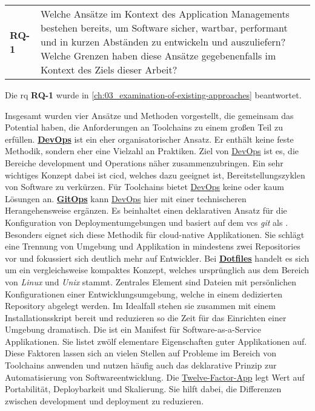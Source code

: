 \vspace{1em}
\begin{table}[H]
    \centering
    \begin{tabular}{p{} p{}}
        \textbf{RQ-1} & Welche Ansätze im Kontext des Application Managements bestehen bereits, um Software sicher, wartbar, performant und in kurzen Abständen zu entwickeln und auszuliefern? Welche Grenzen haben diese Ansätze gegebenenfalls im Kontext des Ziels dieser Arbeit? \\
    \end{tabular}
\end{table}

Die \acrlong{rq} \textbf{RQ-1} wurde in \autoref{ch:03_examination-of-existing-approaches} beantwortet.

Insgesamt wurden vier Ansätze und Methoden vorgestellt, die gemeinsam das Potential haben, die Anforderungen an Toolchains zu einem großen Teil zu erfüllen. \textbf{\hyperref[sec:03-01_devops]{DevOps}} ist ein eher organisatorischer Ansatz. Er enthält keine feste Methodik, sondern eher eine Vielzahl an Praktiken. Ziel von \hyperref[sec:03-01_devops]{DevOps} ist es, die Bereiche \Gls{development} und Operations näher zusammenzubringen. Ein sehr wichtiges Konzept dabei ist \acrfull{cicd}, welches dazu geeignet ist, Bereitstellungszyklen von Software zu verkürzen. Für Toolchains bietet \hyperref[sec:03-01_devops]{DevOps} keine oder kaum Lösungen an. \textbf{\hyperref[sec:03-03_gitops]{GitOps}} kann \hyperref[sec:03-01_devops]{DevOps} hier mit einer technischeren Herangehensweise ergänzen. Es beinhaltet einen deklarativen Ansatz für die Konfiguration von Deploymentumgebungen und basiert auf dem \acrfull{vcs} \textit{\Gls{git}} als . Besonders eignet sich diese Methodik für \gls{cloud-native} Applikationen. Sie schlägt eine Trennung von Umgebung und Applikation in mindestens zwei Repositories vor und fokussiert sich deutlich mehr auf Entwickler. Bei \textbf{\hyperref[sec:03-04_dotfiles]{Dotfiles}} handelt es sich um ein vergleichsweise kompaktes Konzept, welches ursprünglich aus dem Bereich von \textit{Linux} und \textit{Unix} stammt. Zentrales Element sind Dateien mit persönlichen Konfigurationen einer Entwicklungsumgebung, welche in einem dedizierten Repository abgelegt werden. Im Idealfall stehen sie zusammen mit einem Installationsskript bereit und reduzieren so die Zeit für das Einrichten einer Umgebung dramatisch. Die \textbf{} ist ein Manifest für Software-as-a-Service Applikationen. Sie listet zwölf elementare Eigenschaften guter Applikationen auf. Diese Faktoren lassen sich an vielen Stellen auf Probleme im Bereich von Toolchains anwenden und nutzen häufig auch das deklarative Prinzip zur Automatisierung von Softwareentwicklung. Die \hyperref[sec:03-05_concept-of-twelve-factor-app]{Twelve-Factor-App} legt Wert auf Portabilität, Deploybarkeit und Skalierung. Sie hilft dabei, die Differenzen zwischen \Gls{development} und \Gls{deployment} zu reduzieren.

